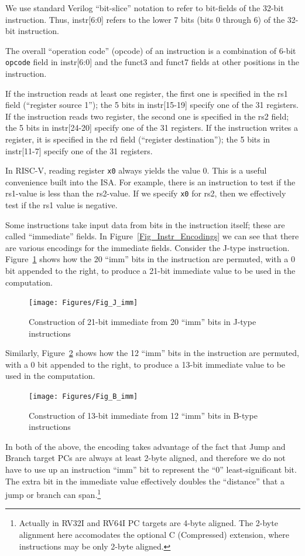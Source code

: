 We use standard Verilog ``bit-slice'' notation to refer to bit-fields
of the 32-bit instruction. Thus, instr[6:0] refers to the lower 7 bits
(bits 0 through 6) of the 32-bit instruction.

The overall ``operation code'' (opcode) of an instruction is a
combination of 6-bit \verb|opcode| field in instr[6:0] and the funct3
and funct7 fields at other positions in the instruction.

If the instruction reads at least one register, the first one is
specified in the rs1 field (``register source 1''); the 5 bits in
instr[15-19] specify one of the 31 registers.  If the instruction
reads two register, the second one is specified in the rs2 field; the
5 bits in instr[24-20] specify one of the 31 registers.  If the
instruction writes a register, it is specified in the rd field
(``register destination''); the 5 bits in instr[11-7] specify one of
the 31 registers.

In RISC-V, reading register \verb|x0| always yields the value 0.  This
is a useful convenience built into the ISA.  For example, there is an
instruction to test if the rs1-value is less than the rs2-value.  If
we specify \verb|x0| for rs2, then we effectively test if the rs1
value is negative.

Some instructions take input data from bits in the instruction itself;
these are called ``immediate'' fields.  In
Figure~\ref{Fig_Instr_Encodings} we can see that there are various
encodings for the immediate fields.  Consider the J-type instruction.
Figure~\ref{Fig_J_imm} shows how the 20 ``imm'' bits in the
instruction are permuted, with a 0 bit appended to the right, to
produce a 21-bit immediate value to be used in the computation.
\begin{figure}[htbp]
  \centerline{\texttt{[image: Figures/Fig\_J\_imm]}}
  \caption{\label{Fig_J_imm} Construction of 21-bit immediate from 20 ``imm'' bits in J-type instructions}
\end{figure}

Similarly, Figure~\ref{Fig_B_imm} shows how the 12 ``imm'' bits in the
instruction are permuted, with a 0 bit appended to the right, to
produce a 13-bit immediate value to be used in the computation.
\begin{figure}[htbp]
  \centerline{\texttt{[image: Figures/Fig\_B\_imm]}}
  \caption{\label{Fig_B_imm} Construction of 13-bit immediate from 12 ``imm'' bits in B-type instructions}
\end{figure}

In both of the above, the encoding takes advantage of the fact that
Jump and Branch target PCs are always at least 2-byte aligned, and
therefore we do not have to use up an instruction ``imm'' bit to
represent the ``0'' least-significant bit.  The extra bit in the
immediate value effectively doubles the ``distance'' that a jump or
branch can span.\footnote{Actually in RV32I and RV64I PC targets are
4-byte aligned. The 2-byte alignment here accomodates the optional C
(Compressed) extension, where instructions may be only 2-byte
aligned.}

